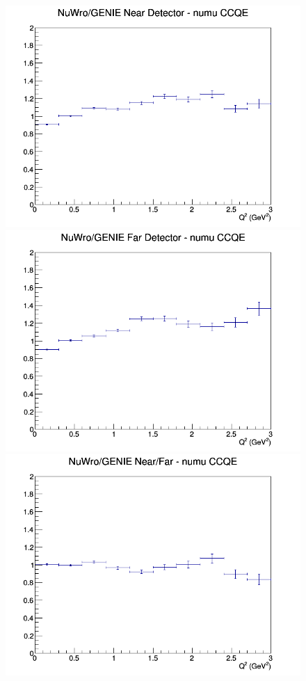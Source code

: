 \documentclass[12pt]{article}
\begin{document}
\begin{figure}[h]
\endminipage
\newline
{}
\includegraphics[width=\linewidth]{Q2/nominal/ratios/CCQE_NuWro_GENIE_numu_near_Q2.png}
\endminipage
{}
\includegraphics[width=\linewidth]{Q2/nominal/ratios/CCQE_NuWro_GENIE_numu_far_Q2.png}
\endminipage
{}
\includegraphics[width=\linewidth]{Q2/nominal/ratios/CCQE_NuWro_GENIE_numu_NF_Q2.png}
\endminipage
\newline
\end{figure}
\clearpage
\end{document}
